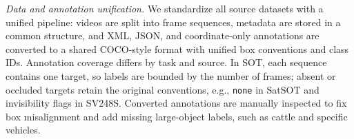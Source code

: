 \documentclass{article}
\begin{document}

\noindent \textit{Data and annotation unification.}
We standardize all source datasets with a unified pipeline: videos are split into frame sequences, metadata are stored in a common structure, and XML, JSON, and coordinate-only annotations are converted to a shared COCO-style format with unified box conventions and class IDs. Annotation coverage differs by task and source. In SOT, each sequence contains one target, so labels are bounded by the number of frames; absent or occluded targets retain the original conventions, e.g., \texttt{none} in SatSOT and invisibility flags in SV248S. Converted annotations are manually inspected to fix box misalignment and add missing large-object labels, such as cattle and specific vehicles.
\end{document}
